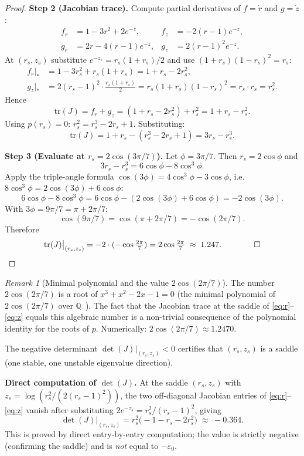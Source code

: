 \documentclass[12pt,a4paper]{article}
\theoremstyle{plain}
\theoremstyle{definition}
\theoremstyle{remark}
\newtheorem{remark}[theorem]{Remark}
\begin{document}
\begin{proof}
\medskip
\textbf{Step 2 (Jacobian trace).}
Compute partial derivatives of $f=\dot r$ and $g=\dot z$:
\begin{align*}
  f_r &= 1-3r^2+2e^{-z}, &
  f_z &= -2(r-1)e^{-z},\\
  g_r &= 2r-4(r-1)e^{-z}, &
  g_z &= 2(r-1)^2 e^{-z}.
\end{align*}
At $(r_s,z_s)$ substitute $e^{-z_s}=r_s(1+r_s)/2$ and use $(1+r_s)(1-r_s)^2=r_s$:
\begin{align*}
  f_r\big|_* &= 1-3r_s^2+r_s(1+r_s) = 1+r_s-2r_s^2,\\
  g_z\big|_* &= 2(r_s-1)^2\cdot\tfrac{r_s(1+r_s)}{2}
             = r_s(1+r_s)(1-r_s)^2 = r_s\cdot r_s = r_s^2.
\end{align*}
Hence
\[
  \mathrm{tr}(J) = f_r+g_z = (1+r_s-2r_s^2)+r_s^2 = 1+r_s-r_s^2.
\]
Using $p(r_s)=0$: $r_s^2 = r_s^3-2r_s+1$.  Substituting:
\[
  \mathrm{tr}(J) = 1+r_s-(r_s^3-2r_s+1) = 3r_s-r_s^3.
\]

\medskip
\textbf{Step 3 (Evaluate at $r_s=2\cos(3\pi/7)$).}
Let $\phi=3\pi/7$.  Then $r_s=2\cos\phi$ and
\[
  3r_s-r_s^3 = 6\cos\phi - 8\cos^3\phi.
\]
Apply the triple-angle formula $\cos(3\phi)=4\cos^3\phi-3\cos\phi$,
i.e.\ $8\cos^3\phi=2\cos(3\phi)+6\cos\phi$:
\[
  6\cos\phi - 8\cos^3\phi = 6\cos\phi - (2\cos(3\phi)+6\cos\phi)
  = -2\cos(3\phi).
\]
With $3\phi = 9\pi/7 = \pi+2\pi/7$:
\[
  \cos(9\pi/7) = \cos(\pi+2\pi/7) = -\cos(2\pi/7).
\]
Therefore
\[
  \mathrm{tr}(J)\big|_{(r_s,z_s)} = -2\cdot(-\cos\tfrac{2\pi}{7})
  = 2\cos\tfrac{2\pi}{7}\;\approx\;1.247.
  \qquad\qed
\]
\end{proof}

\begin{remark}[Minimal polynomial and the value $2\cos(2\pi/7)$]
The number $2\cos(2\pi/7)$ is a root of $x^3+x^2-2x-1=0$
(the minimal polynomial of $2\cos(2\pi/7)$ over $\mathbb{Q}$~\cite{Washington1997}).
The fact that the Jacobian trace at the saddle of \eqref{eq:r}--\eqref{eq:z} equals
this algebraic number is a non-trivial consequence of the polynomial identity
for the roots of $p$.
Numerically: $2\cos(2\pi/7)\approx1.2470$.
\end{remark}

The negative determinant $\det(J)|_{(r_s,z_s)}<0$ certifies that $(r_s,z_s)$ is
a saddle (one stable, one unstable eigenvalue direction).
\medskip

\noindent\textbf{Direct computation of $\det(J)$.}
At the saddle $(r_s,z_s)$ with $z_s = \log(r_s^2/(2(r_s-1)^2))$, the two off-diagonal
Jacobian entries of \eqref{eq:r}--\eqref{eq:z} vanish after substituting
$2e^{-z_s}=r_s^2/(r_s-1)^2$, giving
\[
  \det(J)\big|_{(r_s,z_s)}
  = r_s^2\!\bigl(-1-r_s-2r_s^2\bigr)
  \;\approx\; -0.364.
\]
This is proved by direct entry-by-entry computation; the value is strictly negative
(confirming the saddle) and is \emph{not} equal to $-\varepsilon_0$.
\end{document}
